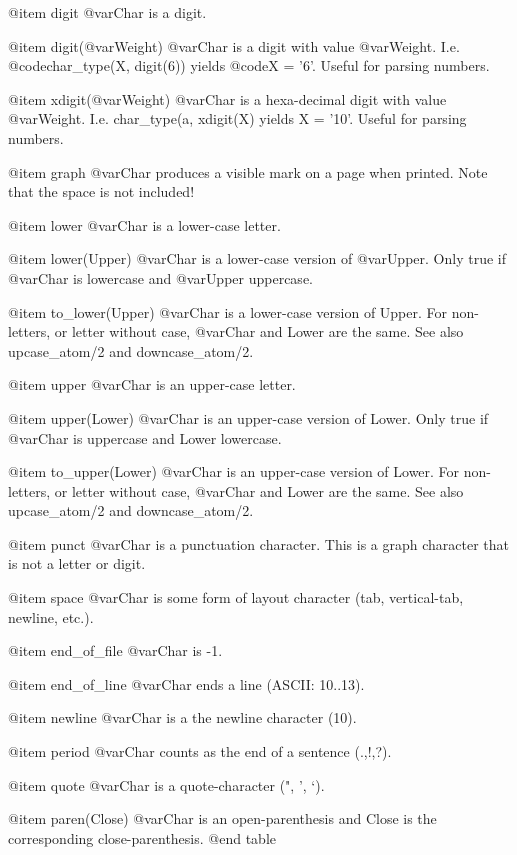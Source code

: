 {{{{@item    digit
        @var{Char} is a digit.

@item    digit(@var{Weight})
        @var{Char} is a digit with value
        @var{Weight}. I.e. @code{char_type(X, digit(6))} yields @code{X =
        '6'}. Useful for parsing numbers.

@item    xdigit(@var{Weight})
        @var{Char} is a hexa-decimal digit with value @var{Weight}. I.e. char_type(a, xdigit(X) yields X = '10'. Useful for parsing numbers.

@item    graph
        @var{Char} produces a visible mark on a page when printed. Note that the space is not included!

@item    lower
        @var{Char} is a lower-case letter.

@item    lower(Upper)
        @var{Char} is a lower-case version of @var{Upper}. Only true if
        @var{Char} is lowercase and @var{Upper} uppercase.

@item    to_lower(Upper)
        @var{Char} is a lower-case version of Upper. For non-letters, or letter without case, @var{Char} and Lower are the same. See also upcase_atom/2 and downcase_atom/2.

@item    upper
        @var{Char} is an upper-case letter.

@item    upper(Lower)
        @var{Char} is an upper-case version of Lower. Only true if @var{Char} is uppercase and Lower lowercase.

@item    to_upper(Lower)
        @var{Char} is an upper-case version of Lower. For non-letters, or letter without case, @var{Char} and Lower are the same. See also upcase_atom/2 and downcase_atom/2.

@item    punct
        @var{Char} is a punctuation character. This is a graph character that is not a letter or digit.

@item    space
        @var{Char} is some form of layout character (tab, vertical-tab, newline, etc.).

@item    end_of_file
        @var{Char} is -1.

@item    end_of_line
        @var{Char} ends a line (ASCII: 10..13).

@item    newline
        @var{Char} is a the newline character (10).

@item    period
        @var{Char} counts as the end of a sentence (.,!,?).

@item    quote
        @var{Char} is a quote-character (", ', `).

@item    paren(Close)
        @var{Char} is an open-parenthesis and Close is the corresponding close-parenthesis. 
@end table

}}}}
